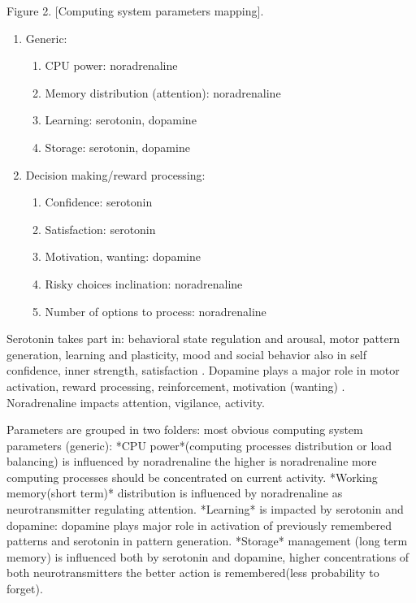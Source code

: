 Figure 2. [Computing system parameters mapping].

\begin{enumerate}
\item  Generic:
\begin{enumerate}
\item  CPU power: noradrenaline
\item  Memory distribution (attention): noradrenaline
\item  Learning: serotonin, dopamine
\item  Storage: serotonin, dopamine
\end{enumerate}
\item  Decision making/reward processing:
\begin{enumerate}
\item  Confidence: serotonin
\item  Satisfaction: serotonin
\item  Motivation, wanting: dopamine
\item  Risky choices inclination: noradrenaline
\item  Number of options to process: noradrenaline
\end{enumerate}
\end{enumerate}


Serotonin takes part in: behavioral state regulation and arousal, motor pattern generation, learning and plasticity, mood and social behavior \cite{anatomic} also in self confidence, inner strength, satisfaction \cite{cubeofemotions}. Dopamine plays a major role in motor activation, reward processing, reinforcement, motivation (wanting) \cite{cubeofemotions, emotionsbraintorobot, roleofemotions}. Noradrenaline impacts attention, vigilance, activity\cite{cubeofemotions}.

Parameters are grouped in two folders: most obvious computing system parameters (generic):
*CPU power*(computing processes distribution or load balancing) is influenced by noradrenaline the higher is noradrenaline more computing processes should be concentrated on current activity.
*Working memory(short term)* distribution is influenced by noradrenaline as neurotransmitter regulating attention.
*Learning* is impacted by serotonin and dopamine: dopamine plays major role in activation of previously remembered patterns and serotonin in pattern generation.
*Storage* management (long term memory) is influenced both by serotonin and dopamine, higher concentrations of both neurotransmitters the better action is remembered(less probability to forget).

